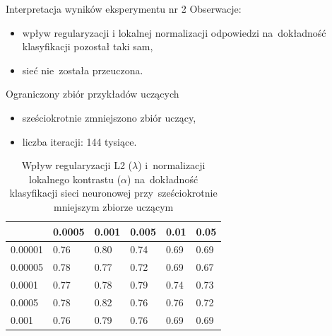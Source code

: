 \documentclass[xcolor=dvipsnames]{beamer}
\begin{document}
\begin{frame}{Interpretacja wyników eksperymentu nr 2}
    Obserwacje:
    \begin{itemize}
        \item wpływ regularyzacji i lokalnej normalizacji odpowiedzi na~dokładność klasyfikacji pozostał taki sam,
        \item sieć nie~została przeuczona.
    \end{itemize}
    \vspace{5mm}
\end{frame}
\begin{frame}{Ograniczony zbiór przykładów uczących}
    \begin{itemize}
        \item sześciokrotnie zmniejszono zbiór uczący,
        \item liczba iteracji: 144 tysiące.
    \end{itemize}
    \begin{table}[H]
        \centering
        \begin{tabular}{|l|l|l|l|l|l|}
            \hline
            \backslashbox{$\alpha$}{$\lambda$} & 0.0005 & 0.001 & 0.005 & 0.01 & 0.05 \\
            \hline
            0.00001 & 0.76 & 0.80 & 0.74 & 0.69 & 0.69 \\
            \hline
            0.00005 & 0.78 & 0.77 & 0.72 & 0.69 & 0.67 \\
            \hline
            0.0001  & 0.77 & 0.78 & 0.79 & 0.74 & 0.73 \\
            \hline
            0.0005  & 0.78 & 0.82 & 0.76 & 0.76 & 0.72 \\
            \hline
            0.001   & 0.76 & 0.79 & 0.76 & 0.69 & 0.69 \\
            \hline
        \end{tabular}
        \caption{Wpływ regularyzacji L2 ($\lambda$) i~normalizacji lokalnego kontrastu ($\alpha$) na~dokładność klasyfikacji
        sieci neuronowej przy~sześciokrotnie mniejszym zbiorze uczącym}
        \label{table:wyniki3}
    \end{table}
\end{frame}
\end{document}

